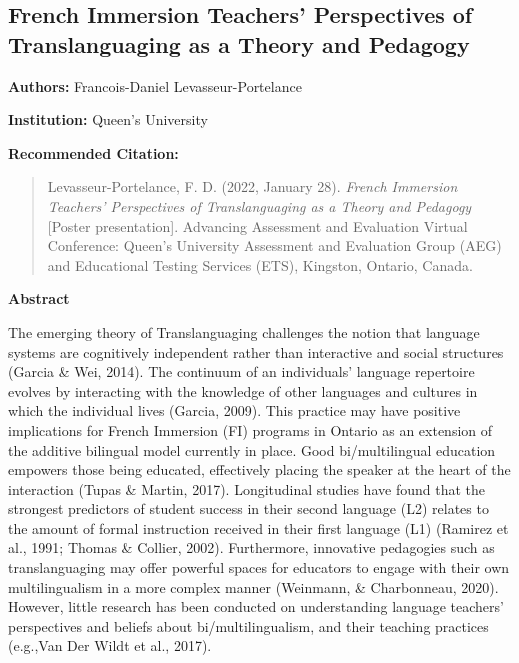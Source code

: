 \documentclass[
]{book}
\begin{document}
\newpage

\hypertarget{french-immersion-teachers-perspectives-of-translanguaging-as-a-theory-and-pedagogy}{%
\subsection{French Immersion Teachers' Perspectives of Translanguaging as a Theory and Pedagogy}\label{french-immersion-teachers-perspectives-of-translanguaging-as-a-theory-and-pedagogy}}

\textbf{Authors:} Francois-Daniel Levasseur-Portelance

\textbf{Institution:} Queen's University

\textbf{Recommended Citation:}

\begin{quote}
Levasseur-Portelance, F. D. (2022, January 28). \emph{French Immersion Teachers' Perspectives of Translanguaging as a Theory and Pedagogy} {[}Poster presentation{]}. Advancing Assessment and Evaluation Virtual Conference: Queen's University Assessment and Evaluation Group (AEG) and Educational Testing Services (ETS), Kingston, Ontario, Canada.
\end{quote}

\textbf{Abstract}

The emerging theory of Translanguaging challenges the notion that language systems are cognitively independent rather than interactive and social structures (Garcia \& Wei, 2014). The continuum of an individuals' language repertoire evolves by interacting with the knowledge of other languages and cultures in which the individual lives (Garcia, 2009). This practice may have positive implications for French Immersion (FI) programs in Ontario as an extension of the additive bilingual model currently in place. Good bi/multilingual education empowers those being educated, effectively placing the speaker at the heart of the interaction (Tupas \& Martin, 2017). Longitudinal studies have found that the strongest predictors of student success in their second language (L2) relates to the amount of formal instruction received in their first language (L1) (Ramirez et al., 1991; Thomas \& Collier, 2002). Furthermore, innovative pedagogies such as translanguaging may offer powerful spaces for educators to engage with their own multilingualism in a more complex manner (Weinmann, \& Charbonneau, 2020). However, little research has been conducted on understanding language teachers' perspectives and beliefs about bi/multilingualism, and their teaching practices (e.g.,Van Der Wildt et al., 2017).
\end{document}
